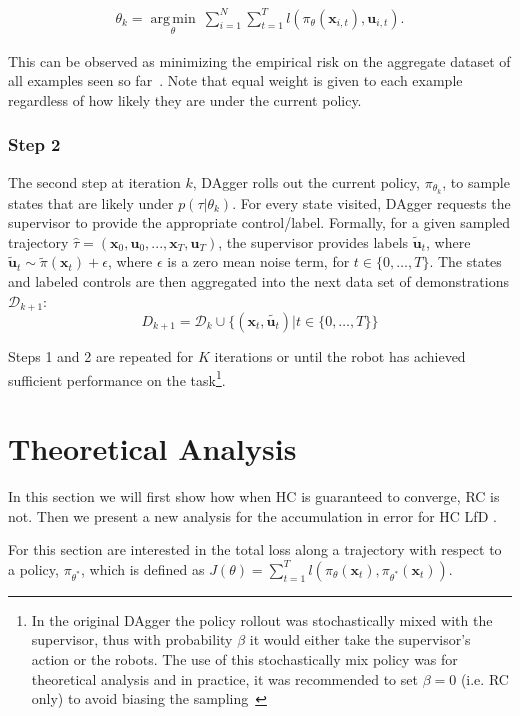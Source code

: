 \documentclass[10pt, conference]{ieeeconf}      %
\DeclareMathOperator*{\argmin}{arg\,min}
\newcommand{\bu}{\mathbf{u}}
\newcommand{\bx}{\mathbf{x}}
\newcommand{\ns}{HC LfD }
\begin{document}
 \vspace{-1ex}
\begin{align}\label{eq:super_objj}
\theta_{k} = \underset{\theta}{\argmin} \: \sum_{i=1}^{N} \sum_{t=1}^T  l(\pi_{\theta}(\bx_{i,t}),\bu_{i,t}).
\end{align}

This can be observed as minimizing the empirical risk on the aggregate dataset of all examples seen so far~\cite{scholkopf2002learning}.  Note that equal weight is given to each example regardless of how likely they are under the current policy.
 

 \subsubsection{Step 2}
The second step at iteration $k$, DAgger rolls out the current policy, $\pi_{\theta_{k}}$, to sample states that are likely under $p(\tau|\theta_{k})$.  For every state visited, DAgger requests the supervisor to provide the appropriate control/label. Formally, for a given sampled trajectory  $\hat{\tau} = (\bx_0,\bu_0,...,\bx_T,\bu_T )$, the supervisor provides labels $\tilde{\bu}_t$, where $\tilde{\bu}_t \sim \tilde{\pi}(\bx_t) + \epsilon$, where $\epsilon$ is a  zero mean noise term, for $t\in \{0, \ldots, T\}$.
The states and labeled controls are then aggregated into the next data set of demonstrations $\mathcal{D}_{k+1}$:
$$D_{k+1}=\mathcal{D}_k \cup \{(\bx_t,\tilde{\bu_t})|t\in\{0,\ldots,T\}\} $$

Steps 1 and 2 are repeated for $K$ iterations or until the robot has achieved sufficient performance on the
task\footnote{In the original DAgger the policy rollout was stochastically mixed with the supervisor, thus with
    probability $\beta$ it would either take the supervisor's action or the robots. The use of this stochastically mix
    policy was for theoretical analysis and in practice, it was recommended to set $\beta = 0$ (i.e. RC only) to avoid biasing the
sampling~\cite{NIPS2014_5421,ross2010reduction}}.


 

\section{Theoretical Analysis}
In this section we will first show how when HC is guaranteed to converge, RC is not.  Then we present a new analysis for the accumulation in error for  \ns. 

For this section are interested in the total loss along a trajectory with respect to a policy, $\pi_{\theta^*}$, which is defined as $J(\theta) = \sum^T_{t=1} l(\pi_{\theta}(\bx_{t}),\pi_{\theta^*}(\bx_{t}))$. 
\end{document}

